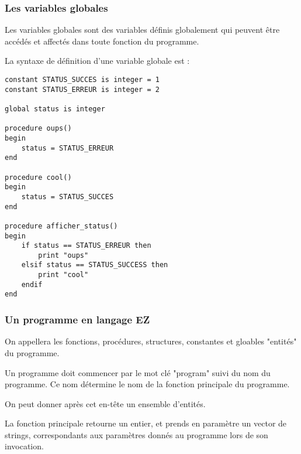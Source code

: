 \subsubsection{Les variables globales}

Les variables globales sont des variables définis globalement qui peuvent être
accédés et affectés dans toute fonction du programme.

La syntaxe de définition d'une variable globale est :
\begin{verbatim}
constant STATUS_SUCCES is integer = 1
constant STATUS_ERREUR is integer = 2

global status is integer

procedure oups()
begin
    status = STATUS_ERREUR
end

procedure cool()
begin
    status = STATUS_SUCCES
end

procedure afficher_status()
begin
    if status == STATUS_ERREUR then
        print "oups"
    elsif status == STATUS_SUCCESS then
        print "cool"
    endif
end
\end{verbatim}


\subsubsection{Un programme en langage EZ}

On appellera les fonctions, procédures, structures, constantes et gloables
"entités" du programme.

Un programme doit commencer par le mot clé "program" suivi du nom du programme.
Ce nom détermine le nom de la fonction principale du programme.

On peut donner après cet en-tête un ensemble d'entités.

La fonction principale retourne un entier, et prends en paramètre un
vector de strings, correspondants aux paramètres donnés au programme lors
de son invocation.

